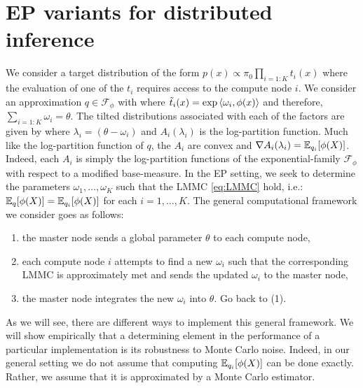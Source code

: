 \section{EP variants for distributed inference}
We consider a target distribution of the form $p(x)\propto \pi_0\prod_{i=1:K}t_i(x)$ where the evaluation of one of the $t_i$ requires access to the compute node $i$. We consider an approximation $q\in\mathcal F_\phi$ with
%
%
where $\tilde t_i(x)=\exp\left\langle \omega_i,\phi(x) \right\rangle$ and therefore, $\sum_{i=1:K}\omega_i=\theta$. The tilted distributions associated with each of the factors are given by
%
% 
where $\lambda_i=(\theta-\omega_i)$ and $A_i(\lambda_i)$ is the log-partition function. Much like the log-partition function of $q$, the $A_i$ are convex and $\nabla A_i(\lambda_i)=\mathbb E_{q_i}[\phi(X)]$. Indeed, each $A_i$ is simply the log-partition functions of the exponential-family $\mathcal F_\phi$ with respect to a modified base-measure.
In the EP setting, we seek to determine the parameters $\omega_1,\dots,\omega_K$ such that the LMMC \eqref{eq:LMMC} hold, i.e.: $\mathbb E_q[\phi(X)]=\mathbb E_{q_i}[\phi(X)]$ for each $i=1,\dots,K$.
The general computational framework we consider goes as follows: 
\begin{enumerate}\itsepa
	\item the master node sends a global parameter $\theta$ to each compute node,
	\item each compute node $i$ attempts to find a new $\omega_i$ such that the corresponding LMMC is approximately met and sends the updated $\omega_i$ to the master node,
	\item the master node integrates the new $\omega_i$ into $\theta$. Go back to (1).
\end{enumerate}

As we will see, there are different ways to implement this general framework.
We will show empirically that a determining element in the performance of a particular implementation is its robustness to Monte Carlo noise. 
Indeed, in our general setting we do not assume that computing $\mathbb E_{q_i}[\phi(X)]$ can be done exactly. Rather, we assume that it is approximated by a Monte Carlo estimator.

\subsection{}
